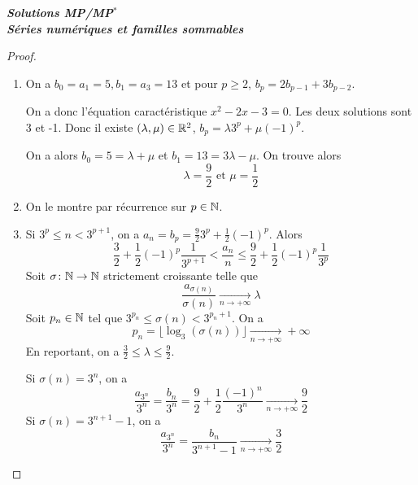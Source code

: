 \documentclass[12pt]{article}
\begin{document}
\begin{titlepage}
	\centering
	\vspace*{\fill}
	\Huge \textit{\textbf{Solutions MP/MP$^*$\\ Séries numériques et familles sommables}}
	\vspace*{\fill}
\end{titlepage}

\begin{proof}
	\phantom{}
	\begin{enumerate}
		\item On a $b_{0}=a_{1}=5,b_{1}=a_{3}=13$ et pour $p\geqslant2$, $b_{p}=2b_{p-1}+3b_{p-2}$.
		
		On a donc l'équation caractéristique $x^{2}-2x-3=0$. Les deux solutions sont 3 et -1. Donc il existe $(\lambda,\mu)\in\mathbb{R}^{2}$, $b_{p}=\lambda 3^{p}+\mu(-1)^{p}$.

		On a alors $b_{0}=5=\lambda+\mu$ et $b_{1}=13=3\lambda-\mu$. On trouve alors 
		\begin{equation}
			\boxed{\lambda=\frac{9}{2} \text{ et } \mu=\frac{1}{2}}
		\end{equation}

		\item On le montre par récurrence sur $p\in\mathbb{N}$.
		
		\item Si $3^{p}\leqslant n<3^{p+1}$, on a $a_{n}=b_{p}=\frac{9}{2}3^{p}+\frac{1}{2}(-1)^{p}$.
		Alors 
		\begin{equation}\frac{3}{2}+\frac{1}{2}(-1)^{p}\frac{1}{3^{p+1}}<\frac{a_{n}}{n}\leqslant\frac{9}{2}+\frac{1}{2}(-1)^{p}\frac{1}{3^{p}}\end{equation}
		Soit $\sigma\colon\mathbb{N}\to\mathbb{N}$ strictement croissante telle que 
		\begin{equation}\frac{a_{\sigma(n)}}{\sigma(n)}\xrightarrow[n\to+\infty]{}\lambda\end{equation}
		Soit $p_{n}\in\mathbb{N}$ tel que $3^{p_{n}}\leqslant\sigma(n)<3^{p_{n}+1}$. On a 
		\begin{equation}p_{n}=\bigl\lfloor\log_{3}(\sigma(n))\bigr\rfloor\xrightarrow[n\to+\infty]{}+\infty\end{equation}
		En reportant, on a $\frac{3}{2}\leqslant\lambda\leqslant\frac{9}{2}$.

		Si $\sigma(n)=3^{n}$, on a 
		\begin{equation}\frac{a_{3^{n}}}{3^{n}}=\frac{b_{n}}{3^{n}}=\frac{9}{2}+\frac{1}{2}\frac{(-1)^{n}}{3^{n}}\xrightarrow[n\to+\infty]{}\frac{9}{2}\end{equation}
		Si $\sigma(n)=3^{n+1}-1$, on a 
		\begin{equation}\frac{a_{3^{n}}}{3^{n}}=\frac{b_{n}}{3^{n+1}-1}\xrightarrow[n\to+\infty]{}\frac{3}{2}\end{equation}


\end{enumerate}
\end{proof}
\end{document}
